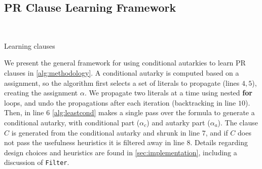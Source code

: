 
\subsection{PR Clause Learning Framework}~\label{subsec:methodology}

\begin{algorithm}\caption{Learning \pr clauses}\label{alg:methodology}
    \SetAlgoNoLine {}
     
     
     
      
\end{algorithm}

We present the general framework for using conditional autarkies to learn PR
clauses in \autoref{alg:methodology}. A conditional autarky is computed based on
a assignment, so the algorithm first selects a set of literals to propagate
(lines $4,5$), creating the assignment $\alpha$. We propagate two literals at a
time using nested \textbf{for} loops, and undo the propagations after each
iteration (backtracking in line $10$). Then, in line $6$ \autoref{alg:leastcond}
makes a single pass over the formula to generate a conditional autarky, with
conditional part ($\alpha_c$) and autarky part ($\alpha_a$). The \pr clause $C$
is generated from the conditional autarky and shrunk in line $7$, and if $C$
does not pass the usefulness heuristics it is filtered away in line $8$. Details
regarding design choices and heuristics are found in
\autoref{sec:implementation}, including a discussion of \texttt{Filter}.

